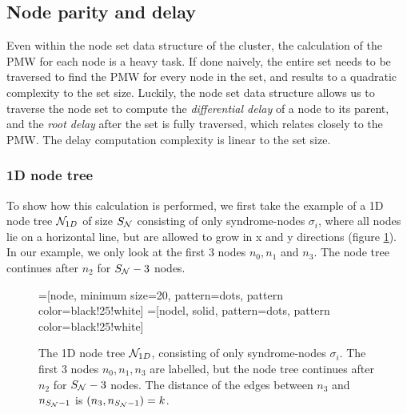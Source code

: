 \subsection{Node parity and delay}\label{sec:nodedelay}

Even within the node set data structure of the cluster, the calculation of the PMW for each node is a heavy task. If done naively, the entire set needs to be traversed to find the PMW for every node in the set, and results to a quadratic complexity to the set size. Luckily, the node set data structure allows us to traverse the node set to compute the \emph{differential delay} of a node to its parent, and the \emph{root delay} after the set is fully traversed, which relates closely to the PMW. The delay computation complexity is linear to the set size.

\subsubsection{1D node tree}
To show how this calculation is performed, we first take the example of a 1D node tree $\mathcal{N}_{1D}$ of size $S_{\mathcal{N}}$ consisting of only syndrome-nodes $\sigma_i$, where all nodes lie on a horizontal line, but are allowed to grow in x and y directions (figure \ref{fig:1dnodetree}). In our example, we only look at the first 3 nodes $n_0, n_1$ and $n_3$. The node tree continues after $n_2$ for $S_{\mathcal{N}} - 3$ nodes.

\begin{figure}
  \centering
  =[node, minimum size=20, pattern=dots, pattern color=black!25!white]
  =[nodel, solid, pattern=dots, pattern color=black!25!white]
  \caption{The 1D node tree $\mathcal{N}_{1D}$, consisting of only syndrome-nodes $\sigma_i$. The first 3 nodes $n_0, n_1, n_3$ are labelled, but the node tree continues after $n_2$ for $S_{\mathcal{N}} - 3$ nodes. The distance of the edges between $n_3$ and $n_{S_{\mathcal{N}}-1}$ is $(n_3, n_{S_{\mathcal{N}}-1})=k$.}\label{fig:1dnodetree}
\end{figure}

